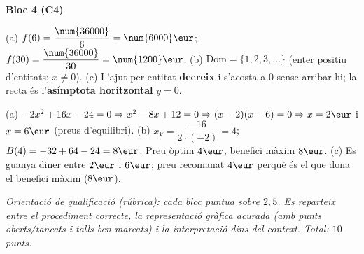 \begin{solucions}
\noindent\textbf{Bloc 4 (C4)}
\begin{sollist}\setcounter{enumi}{5}
  \item (a) $f(6)=\dfrac{\num{36000}}{6}=\num{6000}\eur$;
        $f(30)=\dfrac{\num{36000}}{30}=\num{1200}\eur$. \quad
        (b) $\mathrm{Dom}=\{1,2,3,\dots\}$ (enter positiu d'entitats; $x\neq 0$). \quad
        (c) L'ajut per entitat \textbf{decreix} i s'acosta a $0$ sense arribar-hi; la
        recta és l'\textbf{asímptota horitzontal} $y=0$.
  \item (a) $-2x^2+16x-24=0 \Rightarrow x^2-8x+12=0 \Rightarrow (x-2)(x-6)=0
        \Rightarrow x=2\eur$ i $x=6\eur$ (preus d'equilibri). \quad
        (b) $x_V=\dfrac{-16}{2\cdot(-2)}=4$; $B(4)=-32+64-24=8\eur$. Preu òptim
        $4\eur$, benefici màxim $8\eur$. \quad
        (c) Es guanya diner entre $2\eur$ i $6\eur$; preu recomanat $4\eur$ perquè és
        el que dona el benefici màxim ($8\eur$).
\end{sollist}

\end{solucions}

\noindent\small\textit{Orientació de qualificació (rúbrica): cada bloc puntua sobre
$2,5$. Es reparteix entre el procediment correcte, la representació gràfica acurada
(amb punts oberts/tancats i talls ben marcats) i la interpretació dins del context.
Total: $10$ punts.}
